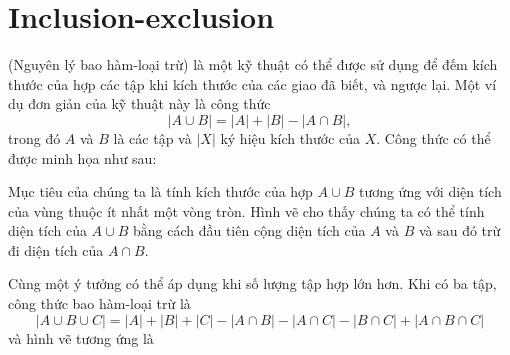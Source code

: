 \section{Inclusion-exclusion}


 (Nguyên lý bao hàm-loại trừ) là một kỹ thuật
có thể được sử dụng để đếm kích thước
của hợp các tập khi kích thước của
các giao đã biết, và ngược lại.
Một ví dụ đơn giản của kỹ thuật này là công thức
\[ |A \cup B| = |A| + |B| - |A \cap B|,\]
trong đó $A$ và $B$ là các tập và $|X|$
ký hiệu kích thước của $X$.
Công thức có thể được minh họa như sau:

\begin{center}
\end{center}

Mục tiêu của chúng ta là tính
kích thước của hợp $A \cup B$
tương ứng với diện tích của vùng
thuộc ít nhất một vòng tròn.
Hình vẽ cho thấy chúng ta có thể tính
diện tích của $A \cup B$ bằng cách đầu tiên cộng
diện tích của $A$ và $B$ và sau đó trừ đi
diện tích của $A \cap B$.

Cùng một ý tưởng có thể áp dụng khi số lượng
tập hợp lớn hơn.
Khi có ba tập, công thức bao hàm-loại trừ là
\[ |A \cup B \cup C| = |A| + |B| + |C| - |A \cap B|  - |A \cap C|  - |B \cap C| + |A \cap B \cap C| \]
và hình vẽ tương ứng là

\begin{center}
\end{center}

